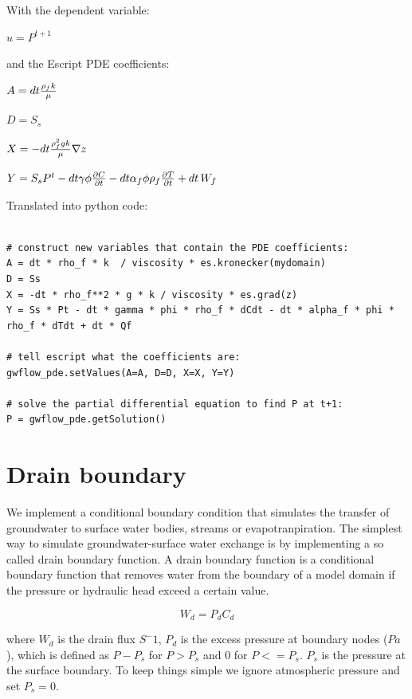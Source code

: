 \documentclass[11pt]{article}
\begin{document}
With the dependent variable:

$ u = P^{t+1} $

and the Escript PDE coefficients:

$ A = dt {\rho_f k \over{\mu} } $

$ D = S_s $

$ X = - dt { \rho_f^2 g k \over{\mu} } \nabla  z $

$ Y = S_s P^{t} - dt \gamma \phi {\partial C \over{\partial t} } - dt \alpha_f \phi \rho_f {\partial T \over{\partial t} }   + dt \, W_f  $


Translated into python code:

\begin{verbatim}

# construct new variables that contain the PDE coefficients:
A = dt * rho_f * k  / viscosity * es.kronecker(mydomain) 
D = Ss
X = -dt * rho_f**2 * g * k / viscosity * es.grad(z)
Y = Ss * Pt - dt * gamma * phi * rho_f * dCdt - dt * alpha_f * phi * rho_f * dTdt + dt * Qf

# tell escript what the coefficients are:
gwflow_pde.setValues(A=A, D=D, X=X, Y=Y)

# solve the partial differential equation to find P at t+1:
P = gwflow_pde.getSolution()

\end{verbatim}


\section{Drain boundary}

We implement a conditional boundary condition that simulates the transfer of groundwater to surface water bodies, streams or evapotranpiration. The simplest way to simulate groundwater-surface water exchange is by implementing a so called drain boundary function. A drain boundary function is a conditional boundary function that removes water from the boundary of a model domain if the pressure or hydraulic head exceed a certain value. 

\begin{equation}
	W_d = P_d C_d
\end{equation}

where $W_d$ is the drain flux $S^-1$, $P_d$ is the excess pressure at boundary nodes ($Pa$), which is defined as $P - P_s$ for $P>P_s$ and $0$ for $P <= P_s$. $P_s$ is the pressure at the surface boundary. To keep things simple we ignore atmospheric pressure and set $P_s = 0$. 
\end{document}
